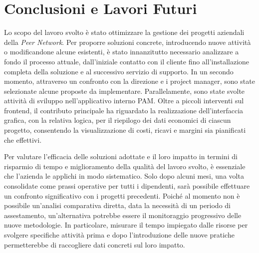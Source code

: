 \chapter{Conclusioni e Lavori Futuri}


Lo scopo del lavoro svolto è stato ottimizzare la gestione dei progetti aziendali della \textit{Peer Network}.
Per proporre soluzioni concrete, introducendo nuove attività o modificandone alcune esistenti, è stato
innanzitutto necessario analizzare a fondo il processo attuale, dall’iniziale contatto con il cliente
fino all’installazione completa della soluzione e al successivo servizio di supporto. In un secondo momento,
attraverso un confronto con la direzione e i project manager, sono state selezionate alcune proposte
da implementare. Parallelamente, sono state svolte attività di sviluppo nell’applicativo interno \ac{PAM}.
Oltre a piccoli interventi sul frontend, il contributo principale ha riguardato la realizzazione
dell’interfaccia grafica, con la relativa logica, per il riepilogo dei dati economici di ciascun
progetto, consentendo la visualizzazione di costi, ricavi e margini sia pianificati che effettivi.

Per valutare l’efficacia delle soluzioni adottate e il loro impatto in termini di risparmio
di tempo e miglioramento della qualità del lavoro svolto, è essenziale che l’azienda le applichi in
modo sistematico. Solo dopo alcuni mesi, una volta consolidate come prassi operative per tutti i dipendenti,
sarà possibile effettuare un confronto significativo con i progetti precedenti.
Poiché al momento non è possibile un’analisi comparativa diretta, data la necessità di un periodo di
assestamento, un’alternativa potrebbe essere il monitoraggio progressivo delle nuove metodologie.
In particolare, misurare il tempo impiegato dalle risorse per svolgere specifiche attività prima e
dopo l’introduzione delle nuove pratiche permetterebbe di raccogliere dati concreti sul loro impatto.

